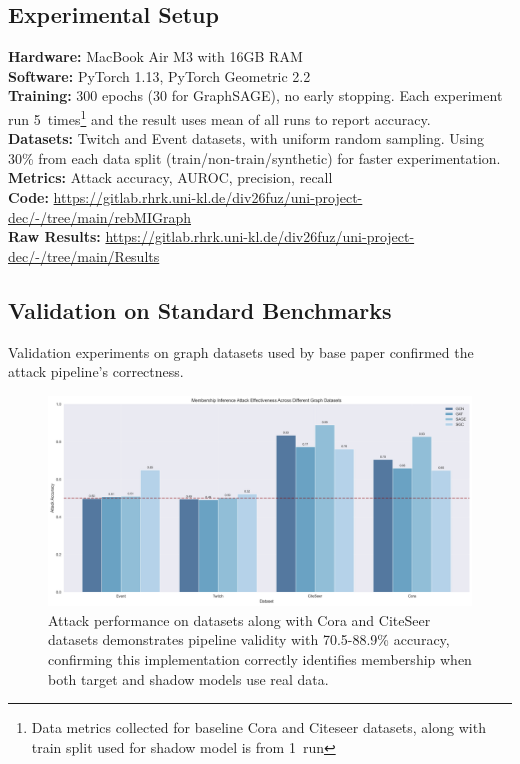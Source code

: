 \documentclass{article}
\begin{document}
\subsection{Experimental Setup}
\textbf{Hardware:} MacBook Air M3 with 16GB RAM\\
\textbf{Software:} PyTorch 1.13, PyTorch Geometric 2.2\\
\textbf{Training:} 300 epochs (30 for GraphSAGE), no early stopping. Each experiment run 5~times\footnote{Data metrics collected for baseline Cora and Citeseer datasets, along with train split used for shadow model is from 1~run} and the result uses mean of all runs to report accuracy.\\
\textbf{Datasets:} Twitch and Event datasets, with uniform random sampling. Using 30\% from each data split (train/non-train/synthetic) for faster experimentation.\\
\textbf{Metrics:} Attack accuracy, AUROC, precision, recall\\
\textbf{Code:} \url{https://gitlab.rhrk.uni-kl.de/div26fuz/uni-project-dec/-/tree/main/rebMIGraph} \\
\textbf{Raw Results:} \url{https://gitlab.rhrk.uni-kl.de/div26fuz/uni-project-dec/-/tree/main/Results}

\subsection{Validation on Standard Benchmarks}
Validation experiments on graph datasets used by base paper \cite{olatunji2021membershipinferenceattackgraph} confirmed the attack pipeline's correctness.

\begin{figure}[H]
\centering
\includegraphics[width=\textwidth]{../Results/visualizations/comprehensive_datasets_comparison.png}
\caption{Attack performance on datasets along with Cora and CiteSeer datasets demonstrates pipeline validity with 70.5-88.9\% accuracy, confirming this implementation correctly identifies membership when both target and shadow models use real data.}
\label{fig:baseline}
\end{figure}
\end{document}
